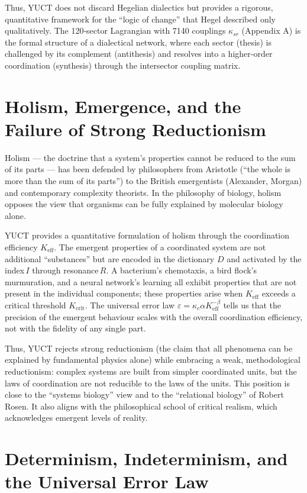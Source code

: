 \documentclass[12pt,a4paper]{article}
\begin{document}
	Thus, YUCT does not discard Hegelian dialectics but provides a rigorous, quantitative framework for the “logic of change” that Hegel described only qualitatively. The 120‑sector Lagrangian with 7140 couplings \(\kappa_{sr}\) (Appendix A) is the formal structure of a dialectical network, where each sector (thesis) is challenged by its complement (antithesis) and resolves into a higher‑order coordination (synthesis) through the intersector coupling matrix.
	
	\section{Holism, Emergence, and the Failure of Strong Reductionism}
	
	Holism — the doctrine that a system’s properties cannot be reduced to the sum of its parts — has been defended by philosophers from Aristotle (“the whole is more than the sum of its parts”) to the British emergentists (Alexander, Morgan) and contemporary complexity theorists. In the philosophy of biology, holism opposes the view that organisms can be fully explained by molecular biology alone.
	
	YUCT provides a quantitative formulation of holism through the coordination efficiency \(K_{\mathrm{eff}}\). The emergent properties of a coordinated system are not additional “substances” but are encoded in the dictionary \(D\) and activated by the index \(I\) through resonance \(R\). A bacterium’s chemotaxis, a bird flock’s murmuration, and a neural network’s learning all exhibit properties that are not present in the individual components; these properties arise when \(K_{\mathrm{eff}}\) exceeds a critical threshold \(K_{\mathrm{crit}}\). The universal error law \(\varepsilon = \kappa_c \alpha K_{\mathrm{eff}}^{-\beta}\) tells us that the precision of the emergent behaviour scales with the overall coordination efficiency, not with the fidelity of any single part.
	
	Thus, YUCT rejects strong reductionism (the claim that all phenomena can be explained by fundamental physics alone) while embracing a weak, methodological reductionism: complex systems are built from simpler coordinated units, but the laws of coordination are not reducible to the laws of the units. This position is close to the “systems biology” view and to the “relational biology” of Robert Rosen. It also aligns with the philosophical school of critical realism, which acknowledges emergent levels of reality.
	
	\section{Determinism, Indeterminism, and the Universal Error Law}
	
\end{document}

